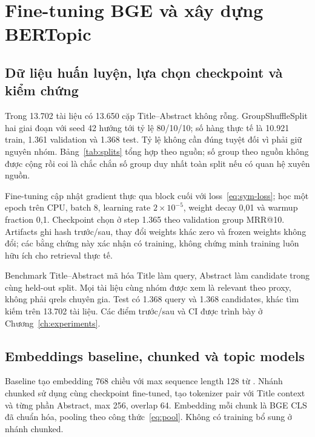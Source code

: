 \section{Fine-tuning BGE và xây dựng BERTopic}
\subsection{Dữ liệu huấn luyện, lựa chọn checkpoint và kiểm chứng}
Trong 13.702 tài liệu có 13.650 cặp Title--Abstract không rỗng. GroupShuffleSplit hai giai đoạn với seed 42 hướng tới tỷ lệ 80/10/10; số hàng thực tế là 10.921 train, 1.361 validation và 1.368 test. Tỷ lệ không cần đúng tuyệt đối vì phải giữ nguyên nhóm. Bảng~\ref{tab:splits} tổng hợp theo nguồn; số group theo nguồn không được cộng rồi coi là chắc chắn số group duy nhất toàn split nếu có quan hệ xuyên nguồn.


Fine-tuning cập nhật gradient thực qua block cuối với loss~\eqref{eq:sym-loss}; học một epoch trên CPU, batch 8, learning rate $2\times10^{-5}$, weight decay 0,01 và warmup fraction 0,1. Checkpoint chọn ở step 1.365 theo validation group MRR@10. Artifacts ghi hash trước/sau, thay đổi weights khác zero và frozen weights không đổi; các bằng chứng này xác nhận có training, không chứng minh training luôn hữu ích cho retrieval thực tế.

Benchmark Title--Abstract mã hóa Title làm query, Abstract làm candidate trong cùng held-out split. Mọi tài liệu cùng nhóm được xem là relevant theo proxy, không phải qrels chuyên gia. Test có 1.368 query và 1.368 candidates, khác tìm kiếm trên 13.702 tài liệu. Các điểm trước/sau và CI được trình bày ở Chương~\ref{ch:experiments}.


\subsection{Embeddings baseline, chunked và topic models}
Baseline tạo embedding 768 chiều với max sequence length 128 từ . Nhánh chunked sử dụng cùng checkpoint fine-tuned, tạo tokenizer pair với Title context và từng phần Abstract, max 256, overlap 64. Embedding mỗi chunk là BGE CLS đã chuẩn hóa, pooling theo công thức~\eqref{eq:pool}. Không có training bổ sung ở nhánh chunked.

